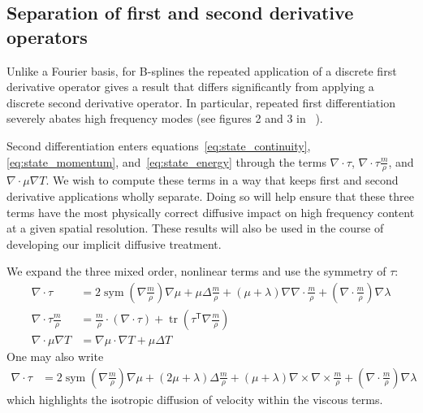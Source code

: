 \documentclass[letterpaper,11pt,nointlimits,reqno,draft]{amsart}
\newcommand{\trans}[1]{{#1}^{\ensuremath{\mathsf{T}}}}
\newcommand{\symmetricpart}[1]
  {\ensuremath{\operatorname{sym}\left(#1\right)}}
\DeclareMathOperator{\trace}{tr}
\begin{document}
\subsection{Separation of first and second derivative operators}
\label{sec:separate_first_second_deriv}

Unlike a Fourier basis, for B-splines the repeated application of a discrete
first derivative operator gives a result that differs significantly from
applying a discrete second derivative operator.  In particular, repeated first
differentiation severely abates high frequency modes (see figures 2 and 3 in
~\cite{Kwok2001}).

Second differentiation enters equations~\eqref{eq:state_continuity},
\eqref{eq:state_momentum}, and~\eqref{eq:state_energy} through the terms
$\nabla\cdot\tau$, $\nabla\cdot\tau\frac{m}{\rho}$, and
$\nabla\cdot\mu\nabla{}T$.  We wish to compute these terms in a way that keeps
first and second derivative applications wholly separate.  Doing so will help
ensure that these three terms have the most physically correct diffusive impact
on high frequency content at a given spatial resolution.  These results will
also be used in the course of developing our implicit diffusive treatment.

We expand the three mixed order, nonlinear terms and use the symmetry of $\tau$:
\begin{align}
\label{eq:nabla_cdot_tau_expansion}
  \nabla\cdot\tau
  &=
    2 \symmetricpart{\nabla\frac{m}{\rho}}\nabla\mu
  + \mu \Delta\frac{m}{\rho}
  + \left(\mu+\lambda\right)\nabla\nabla\cdot\frac{m}{\rho}
  + \left(\nabla\cdot\frac{m}{\rho}\right)\nabla\lambda
\\
\label{eq:nabla_cdot_tau_u_expansion}
  \nabla\cdot\tau{}\frac{m}{\rho}
  &=
    \frac{m}{\rho}\cdot\left(\nabla\cdot\tau\right)
  + \trace\left( \trans{\tau}\nabla\frac{m}{\rho} \right)
\\
  \nabla\cdot\mu\nabla{}T \label{eq:mu_delta_T}
  &=
    \nabla\mu\cdot\nabla{}T
  + \mu \Delta{}T
\end{align}
One may also write
\begin{align}\label{eq:nabla_cdot_tau_expansion_alt}
  \nabla\cdot\tau
  &=
    2 \symmetricpart{\nabla\frac{m}{\rho}}\nabla\mu
  + \left(2\mu+\lambda\right) \Delta\frac{m}{\rho}
  + \left(\mu+\lambda\right)\nabla\times\nabla\times\frac{m}{\rho}
  + \left(\nabla\cdot\frac{m}{\rho}\right)\nabla\lambda
\end{align}
which highlights the isotropic diffusion of velocity within the viscous terms.
\end{document}
